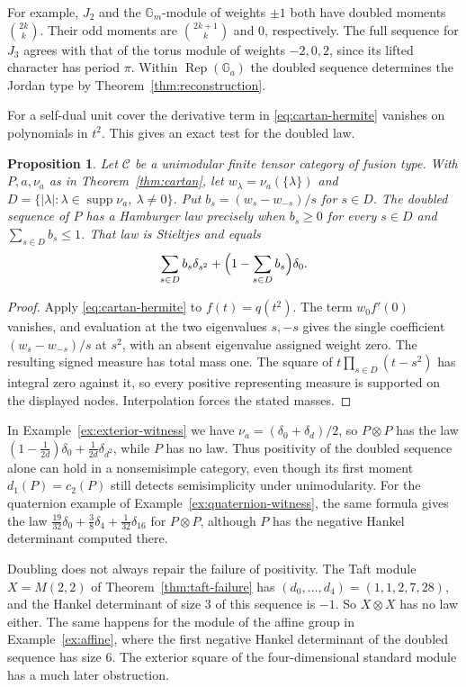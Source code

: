 \documentclass[11pt,reqno]{amsart}
\newtheorem{proposition}[theorem]{Proposition}
\theoremstyle{definition}
\newcommand{\C}{\mathcal C}
\newcommand{\Ga}{\mathbb G_a}
\newcommand{\Gm}{\mathbb G_m}
\newcommand{\Rep}{\operatorname{Rep}}
\DeclareMathOperator{\supp}{supp}
\begin{document}
For example, $J_2$ and the $\Gm$-module of weights $\pm1$ both have doubled moments $\binom{2k}k$. Their odd moments are $\binom{2k+1}k$ and $0$, respectively. The full sequence for $J_3$ agrees with that of the torus module of weights $-2,0,2$, since its lifted character has period $\pi$. Within $\Rep(\Ga)$ the doubled sequence determines the Jordan type by Theorem~\ref{thm:reconstruction}.

For a self-dual unit cover the derivative term in \eqref{eq:cartan-hermite} vanishes on polynomials in $t^2$. This gives an exact test for the doubled law.

\begin{proposition}\label{prop:doubling-cartan}
Let $\C$ be a unimodular finite tensor category of fusion type. With $P,a,\nu_a$
as in Theorem~\ref{thm:cartan}, let $w_\lambda=\nu_a(\{\lambda\})$ and
$D=\{|\lambda|:\lambda\in\supp\nu_a,\ \lambda\ne0\}$.
Put $b_s=(w_s-w_{-s})/s$ for $s\in D$. The doubled sequence of $P$
has a Hamburger law precisely when $b_s\ge0$ for every $s\in D$ and
$\sum_{s\in D}b_s\le1$. That law is Stieltjes and equals
\[
 \sum_{s\in D}b_s\delta_{s^2}
 +\Bigl(1-\sum_{s\in D}b_s\Bigr)\delta_0 .
\]
\end{proposition}
\begin{proof}
Apply \eqref{eq:cartan-hermite} to $f(t)=q(t^2)$. The term $w_0f'(0)$ vanishes, and evaluation at the two eigenvalues $s,-s$ gives the single coefficient $(w_s-w_{-s})/s$ at $s^2$, with an absent eigenvalue assigned weight zero. The resulting signed measure has total mass one. The square of $t\prod_{s\in D}(t-s^2)$ has integral zero against it, so every positive representing measure is supported on the displayed nodes. Interpolation forces the stated masses.
\end{proof}

In Example~\ref{ex:exterior-witness} we have $\nu_a=(\delta_0+\delta_d)/2$, so $P\otimes P$ has the law $(1-\frac1{2d})\delta_0+\frac1{2d}\delta_{d^2}$, while $P$ has no law. Thus positivity of the doubled sequence alone can hold in a nonsemisimple category, even though its first moment $d_1(P)=c_2(P)$ still detects semisimplicity under unimodularity. For the quaternion example of Example~\ref{ex:quaternion-witness}, the same formula gives the law $\frac{19}{32}\delta_0+\frac38\delta_4+\frac1{32}\delta_{16}$ for $P\otimes P$, although $P$ has the negative Hankel determinant computed there.

Doubling does not always repair the failure of positivity. The Taft module $X=M(2,2)$ of Theorem~\ref{thm:taft-failure} has $(d_0,\ldots,d_4)=(1,1,2,7,28)$, and the Hankel determinant of size 3 of this sequence is $-1$. So $X\otimes X$ has no law either. The same happens for the module of the affine group in Example~\ref{ex:affine}, where the first negative Hankel determinant of the doubled sequence has size 6. The exterior square of the four-dimensional standard module has a much later obstruction.
\end{document}
